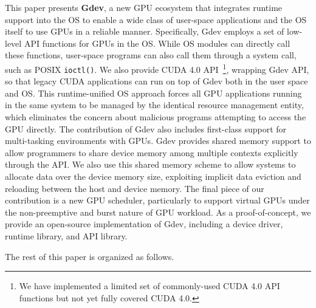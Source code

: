 This paper presents \textbf{Gdev}, a new GPU ecosystem that integrates
runtime support into the OS to enable a wide class of user-space
applications and the OS itself to use GPUs in a reliable manner.
Specifically, Gdev employs a set of low-level API functions for GPUs
in the OS.
While OS modules can directly call these functions, user-space
programs can also call them through a system call, such as POSIX
\texttt{ioctl()}.
We also provide CUDA 4.0 API~\cite{CUDA40}\footnote{We have
implemented a limited set of commonly-used CUDA 4.0 API functions but
not yet fully covered CUDA 4.0.}, wrapping Gdev API, so that legacy CUDA
applications can run on top of Gdev both in the user space and OS.
This runtime-unified OS approach forces all GPU applications running in
the same system to be managed by the identical resource management
entity, which eliminates the concern about malicious programs attempting
to access the GPU directly.
The contribution of Gdev also includes first-class support for
multi-tasking environments with GPUs.
Gdev provides shared memory support to allow programmers to
share device memory among multiple contexts explicitly through the API.
We also use this shared memory scheme to allow systems to allocate data
over the device memory size, exploiting implicit data eviction and
reloading between the host and device memory.
The final piece of our contribution is a new GPU scheduler, particularly
to support virtual GPUs under the non-preemptive and burst nature of GPU
workload.
As a proof-of-concept, we provide an open-source implementation of Gdev,
including a device driver, runtime library, and API library.

The rest of this paper is organized as follows.